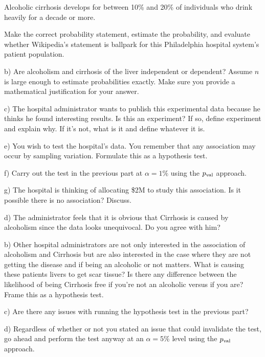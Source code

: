 \documentclass[12pt]{article}
\begin{document}
Alcoholic cirrhosis develops for between 10\% and 20\% of individuals who drink heavily for a decade or more.

Make the correct probability statement, estimate the probability, and evaluate whether Wikipedia's statement is ballpark for this Philadelphia hospital system's patient population.

b) Are alcoholism and cirrhosis of the liver independent or dependent? Assume $n$ is large enough to estimate probabilities exactly. Make sure you provide a mathematical justification for your answer.

c) The hospital administrator wants to publish this experimental data because he thinks he found interesting results. Is this an experiment? If so, define experiment and explain why. If it's not, what is it and define whatever it is.

e) You wish to test the hospital's data. You remember that any association may occur by sampling variation.  Formulate this as a hypothesis test.

f) Carry out the test in the previous part at $\alpha = 1\%$ using the $p_{\text{val}}$ approach.

g) The hospital is thinking of allocating \$2M to study this association. Is it possible there is no association? Discuss.

d) The administrator feels that it is obvious that Cirrhosis is caused by alcoholism since the data looks unequivocal. Do you agree with him?


b) Other hospital administrators are not only interested in the association of alcoholism and Cirrhosis but are also interested in the case where they are not getting the disease and if being an alcoholic or not matters.  What is causing these patients livers to get scar tissue? Is there any difference between the likelihood of being Cirrhosis free if you're not an alcoholic versus if you are? Frame this as a hypothesis test.

c) Are there any issues with running the hypothesis test in the previous part?

d) Regardless of whether or not you stated an issue that could invalidate the test, go ahead and perform the test anyway at an $\alpha = 5\%$ level using the $p_{\text{val}}$ approach.
\end{document}
